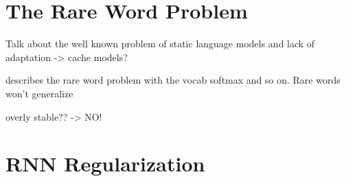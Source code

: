 \section{The Rare Word Problem}
\label{sec:problemRare}

Talk about the well known problem of static language models and lack of adaptation -> cache models?

\cite{gulcehre2016pointing} describes the rare word problem with the vocab softmax and so on. Rare words won't generalize

overly stable?? -> NO!

\section{RNN Regularization}
\label{sec:rnnRegularization}

